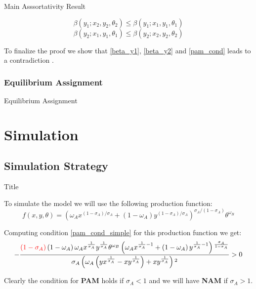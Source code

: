 \documentclass[notes,11pt, aspectratio=169]{beamer}
\newenvironment{wideitemize}{\itemize\addtolength{\itemsep}{10pt}}{\enditemize}
\begin{document}
\begin{frame}[label=main_result]{Main Asssortativity Result}
{\begin{wideitemize}
			\begin{equation}\label{beta_y1}
				\beta(y_1; x_2, y_2, \theta_2) \leq \beta(y_1; x_1, y_1, \theta_1) 
			\end{equation}
			\begin{equation}\label{beta_y2}
				\beta(y_2; x_1, y_1, \theta_1) \leq \beta(y_2; x_2, y_2, \theta_2) 
			\end{equation}
		\item To finalize the proof we show that \eqref{beta_y1}, \eqref{beta_y2} and \eqref{pam_cond} leads to a contradiction \hyperlink{appendix_proof_prop_2<2>}{}.
		\end{wideitemize}
	}
\end{frame}

\subsubsection{Equilibrium Assignment}
\begin{frame}{Equilibrium Assignment}
\end{frame}

\section{Simulation}
\subsection{Simulation Strategy}
\begin{frame}{Title}
	\begin{wideitemize}
		
		\item{} To simulate the model we will use the following production function:
				\[f(x,y,\theta) = \left(\omega_{A} x^{\left(1-\sigma_{A}\right) / \sigma_{A}}+\left(1-\omega_{A}\right) y^{\left(1-\sigma_{A}\right) / \sigma_{A}}\right)^{\sigma_{A} /\left(1-\sigma_{A}\right)} \theta^{\omega_{B}}\]
	
		\item{}	Computing condition \ref{pam_cond_simple} for this production function we get:
				\begin{equation}
					-\frac{\textcolor{red}{\left(1-\sigma _A\right)} \left(1-\omega _A\right) \omega
					_A x^{\frac{1}{\sigma _A}} y^{\frac{1}{\sigma _A}} \theta
				^{\omega _B} \left(\omega _A x^{\frac{1}{\sigma
				_A}-1}+\left(1-\omega_A\right) y^{\frac{1}{\sigma
				_A}-1}\right){}^{\frac{\sigma _A}{1-\sigma _A}}}{\sigma _A
				\left(\omega _A \left(y x^{\frac{1}{\sigma _A}}-x
				y^{\frac{1}{\sigma _A}}\right)+x y^{\frac{1}{\sigma
				_A}}\right){}^2} > 0
				\end{equation}
	
		\item{} Clearly the condition for \textbf{PAM} holds if $\sigma_A < 1$ and we will have \textbf{NAM} if $\sigma_A > 1$.
	\end{wideitemize}
\end{frame}
\end{document}
